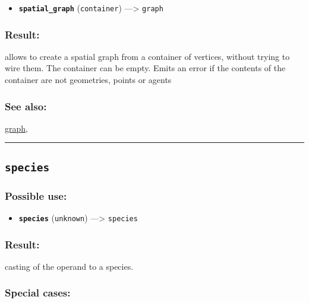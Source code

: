 \documentclass[]{book}
\providecommand{\tightlist}{%
  \setlength{\itemsep}{0pt}\setlength{\parskip}{0pt}}
\theoremstyle{definition}
\theoremstyle{definition}
\theoremstyle{definition}
\theoremstyle{remark}
\begin{document}
\begin{itemize}
\tightlist
\item
  \textbf{\texttt{spatial\_graph}} (\texttt{container})
  ---\textgreater{} \texttt{graph}
\end{itemize}

\subsubsection{Result:}\label{result-472}

allows to create a spatial graph from a container of vertices, without
trying to wire them. The container can be empty. Emits an error if the
contents of the container are not geometries, points or agents

\subsubsection{See also:}\label{see-also-190}

\href{OperatorsDH\#graph}{graph},

\begin{center}\rule{0.5\linewidth}{\linethickness}\end{center}

\subsection{\texorpdfstring{\texttt{species}}{species}}\label{species}

\subsubsection{Possible use:}\label{possible-use-489}

\begin{itemize}
\tightlist
\item
  \textbf{\texttt{species}} (\texttt{unknown}) ---\textgreater{}
  \texttt{species}
\end{itemize}

\subsubsection{Result:}\label{result-473}

casting of the operand to a species.

\subsubsection{Special cases:}\label{special-cases-126}
\end{document}
